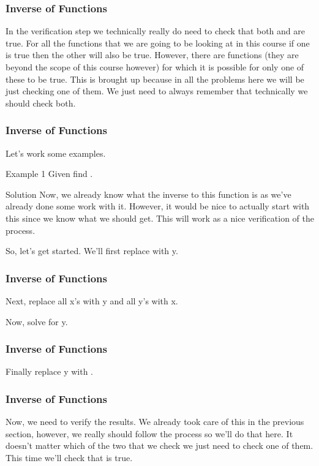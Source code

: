 \documentclass{beamer}
\begin{document}
\begin{frame}[fragile]
	\frametitle{Inverse of Functions}
	\Large
In the verification step we technically really do need to check that both  and  are true.  For all the functions that we are going to be looking at in this course if one is true then the other will also be true.  However, there are functions (they are beyond the scope of this course however) for which it is possible for only one of these to be true.  This is brought up because in all the problems here we will be just checking one of them.  We just need to always remember that technically we should check both.
\end{frame}
\begin{frame}[fragile]
	\frametitle{Inverse of Functions}
	\Large
Let’s work some examples.

Example 1  Given   find .

Solution
Now, we already know what the inverse to this function is as we’ve already done some work with it.  However, it would be nice to actually start with this since we know what we should get.  This will work as a nice verification of the process.

So, let’s get started.  We’ll first replace  with y.

\end{frame}
\begin{frame}[fragile]
	\frametitle{Inverse of Functions}
	\Large
Next, replace all x’s with y and all y’s with x.


Now, solve for y.

\end{frame}
\begin{frame}[fragile]
	\frametitle{Inverse of Functions}
	\Large
Finally replace y with .


\end{frame}
\begin{frame}[fragile]
	\frametitle{Inverse of Functions}
	\Large
Now, we need to verify the results.  We already took care of this in the previous section, however, we really should follow the process so we’ll do that here.  It doesn’t matter which of the two that we check we just need to check one of them.  This time we’ll check that  is true.

\end{frame}
\end{document}
